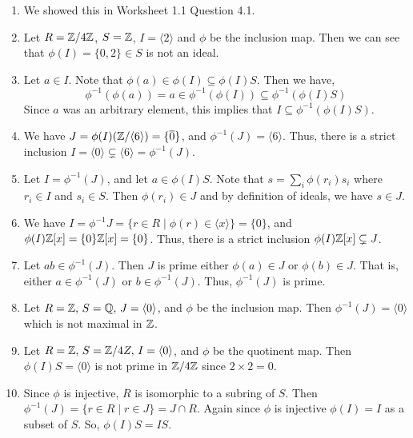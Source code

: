 \documentclass[Notebook.tex]{subfiles}
\begin{document}
\begin{solution}
	\bbni
	\begin{enumerate}
		\item We showed this in Worksheet 1.1 Question 4.1. 
		
		\item Let $R = \mathbb Z/4\mathbb Z$, $S = \mathbb Z$, $I = \langle 2 \rangle$ and $\phi$ be the inclusion map. Then we can see that $\phi(I) = \{0, 2\} \in S$ is not an ideal. 
		
		\item Let $a \in I$. Note that $\phi(a) \in \phi(I) \subseteq \phi(I)S$. Then we have, 
		\[\phi^{-1}(\phi(a)) = a \in \phi^{-1}(\phi(I)) \subseteq \phi^{-1}(\phi(I)S)\]
		Since $a$ was an arbitrary element, this implies that $I \subseteq \phi^{-1}(\phi(I)S)$. 

		\item We have $J = \phi(I)(\mathbb Z/\langle 6 \rangle) = \{\overline{0}\}$, and $\phi^{-1}(J) = \langle 6 \rangle$. Thus, there is a strict inclusion $I = \langle 0 \rangle \subsetneq \langle 6 \rangle = \phi^{-1}(J)$. 
		
		\item Let $I = \phi^{-1}(J)$, and let $a \in \phi(I)S$. Note that $s = \sum_i \phi(r_i)s_i$ where $r_i \in I$ and $s_i \in S$. Then $\phi(r_i) \in J$ and by definition of ideals, we have $s \in J$.  
		
		\item We have $I = \phi^{-1}J = \{r \in R \mid \phi(r) \in \langle x \rangle\} = \{0\}$, and $\phi(I)\mathbb Z[x] = \{0\}\mathbb Z[x] = \{0\}$. Thus, there is a strict inclusion $\phi(I)\mathbb Z[x] \subsetneq J$. 
		
		\item Let $ab \in \phi^{-1}(J)$. Then $J$ is prime either $\phi(a) \in J$ or $\phi(b) \in J$. That is, either $a \in \phi^{-1}(J)$ or $b \in \phi^{-1}(J)$. Thus, $\phi^{-1}(J)$ is prime. 
		
		\item Let $R = \mathbb Z, \, S = \mathbb Q, \, J = \langle 0 \rangle$, and $\phi$ be the inclusion map. Then $\phi^{-1}(J) = \langle 0 \rangle$ which is not maximal in $\mathbb Z$. 
		
		\item Let $R = \mathbb Z, \, S = \mathbb Z/4Z, \, I = \langle 0 \rangle$, and $\phi$ be the quotinent map. Then $\phi(I)S = \langle 0 \rangle$ is not prime in $\mathbb Z/4\mathbb Z$ since $2 \times 2 = 0$. 
		
		\item Since $\phi$ is injective, $R$ is isomorphic to a subring of $S$. Then $\phi^{-1}(J) =\{r \in R \mid r \in J\} = J \cap R$. Again since $\phi$ is injective $\phi(I) = I$ as a subset of $S$. So, $\phi(I)S = IS$.   
	\end{enumerate}
\end{solution}
\end{document}
